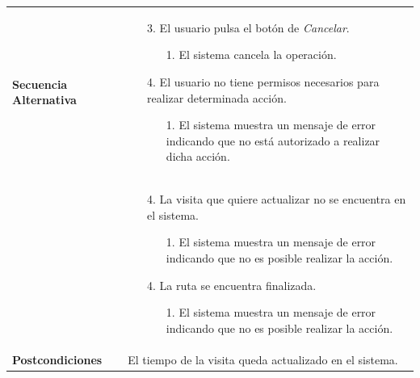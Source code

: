 \begin{longtable}{| p{4cm} | p{10cm} |}
\\
\hline
\textbf{Secuencia Alternativa} &\mbox{}\par\vspace{-\baselineskip}
\begin{enumerate}[leftmargin=0.7cm, topsep=0.1cm]
\item[3.] El usuario pulsa el botón de \textit{Cancelar}.
	\begin{itemize}
	\item[1.] El sistema cancela la operación.
	\end{itemize}
\item[4.] El usuario no tiene permisos necesarios para realizar determinada acción.
	\begin{itemize}
	\item[1.] El sistema muestra un mensaje de error indicando que no está autorizado a realizar dicha acción.
	\end{itemize}
\end{enumerate}
\\ &\mbox{}\par\vspace{-\baselineskip}	
\begin{enumerate}[leftmargin=0.7cm, topsep=0.1cm]
\item[4.] La visita que quiere actualizar no se encuentra en el sistema.
	\begin{itemize}
	\item[1.] El sistema muestra un mensaje de error indicando que no es posible realizar la acción.
	\end{itemize}
\item[4.] La ruta se encuentra finalizada.
	\begin{itemize}
	\item[1.] El sistema muestra un mensaje de error indicando que no es posible realizar la acción.
	\end{itemize}
\end{enumerate}
\\

\hline
\textbf{Postcondiciones} & 
El tiempo de la visita queda actualizado en el sistema.\\
\hline
\end{longtable}



\newpage
